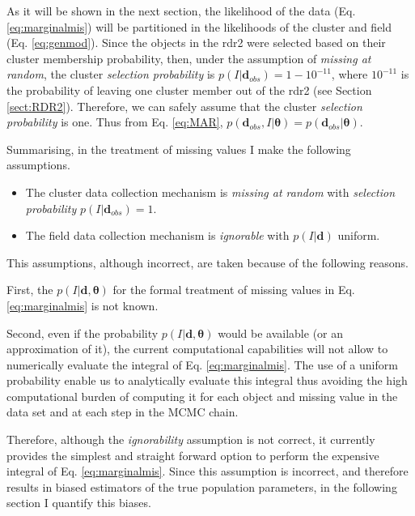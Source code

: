 As it will be shown in the next section, the likelihood of the data (Eq. \ref{eq:marginalmis}) will be partitioned in the likelihoods of the cluster and field (Eq. \ref{eq:genmod}). Since the objects in the \gls{rdr2} were selected based on their cluster membership probability, then, under the assumption of \emph{missing at random}, the cluster \emph{selection probability} is $p(I|\mathbf{d}_{obs})=1 - 10^{-11}$, where $10^{-11}$ is the probability of leaving one cluster member out of the \gls{rdr2} (see Section \ref{sect:RDR2}). Therefore, we can safely assume that the cluster \emph{selection probability} is one. Thus from Eq. \ref{eq:MAR}, $p(\mathbf{d}_{obs},I|\boldsymbol{\theta})=p(\mathbf{d}_{obs}|\boldsymbol{\theta})$.



Summarising, in the treatment of missing values I make the following assumptions.

\begin{itemize}
\item The cluster data collection mechanism is \emph{missing at random} with \emph{selection probability} $p(I|\mathbf{d}_{obs})=1$.
\item The field data collection mechanism is \emph{ignorable} with $p(I|\mathbf{d})$  uniform.
\end{itemize}

This assumptions, although incorrect, are taken because of the following reasons. 

First, the $p(I|\mathbf{d},\boldsymbol{\theta})$ for the formal treatment of missing values in Eq. \ref{eq:marginalmis} is not known.

Second, even if the probability $p(I|\mathbf{d},\boldsymbol{\theta})$ would be available (or an approximation of it), the current computational capabilities will not allow to numerically evaluate the integral of Eq. \ref{eq:marginalmis}. The use of a uniform probability enable us to analytically evaluate this integral thus avoiding the high computational burden of computing it for each object and missing value in the data set and at each step in the MCMC chain.

Therefore, although the \emph{ignorability} assumption is not correct, it currently provides the simplest and straight forward option to perform the expensive integral of Eq. \ref{eq:marginalmis}. Since this assumption is incorrect, and therefore results in biased estimators of the true population parameters, in the following section I quantify this biases.

